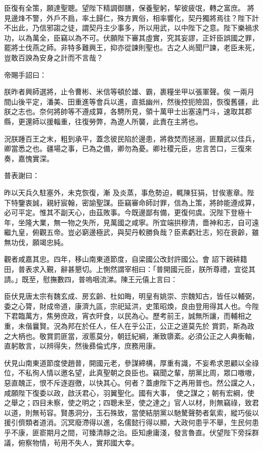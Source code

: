 \begin{pinyinscope}
 臣復有全策，願達聖聰。望陛下精調御膳，保養聖躬，挈彼疲氓，轉之富庶。
 將見邊烽不警，外戶不扃，率土歸仁，殊方異俗，相率響化，契丹獨將焉往？陛下計不出此，乃信邪謅之徒，謂契丹主少事多，所以用武，以中陛下之意。陛下樂禍求功，以為萬全，臣竊以為不可。伏願陛下審其虛實，究其妄謬，正奸臣誤國之罪，罷將士伐燕之師。非特多難興王，抑亦從諫則聖也。古之人尚聞尸諫，老臣未死，豈敢百諛為安身之計而不言哉？



 帝賜手詔曰：



 朕昨者興師選將，止令曹彬、米信等頓於雄、霸，裹糧坐甲以張軍聲。俟
 一兩月間山後平定，潘美、田重進等會兵以進，直抵幽州，然後控扼險固，恢復舊疆，此朕之志也。奈何將帥等不遵成算，各騁所見，領十萬甲士出塞遠門斗，速取其郡縣，更還師以援輜重，往復勞弊，為遼人所襲，此責在主將也。



 況朕踵百王之末，粗到承平，蓋念彼民陷於邊患，將救焚而拯溺，匪黷武以佳兵，卿當悉之也。疆場之事，已為之備，卿勿為憂。卿社稷元臣，忠言苦口，三復來奏，嘉愧實深。



 普表謝曰：



 昨以天兵久駐塞外，未克恢復，漸
 及炎蒸，事危勢迫，輒陳狂狷，甘俟憲章。陛下特鑒衷誠，親紆宸翰，密諭聖謀。臣竊審命師討罪，信為上策，將帥能遵成算，必可平定。惟其不副天心，由茲敗事。今既邊鄙有備，更復何虞。況陛下登極十年，坐隆大業，無一物之失所，見萬國之咸寧。所宜端拱穆清，嗇神和志，自可遠繼九皇，俯觀五帝。豈必窮邊極武，與契丹較勝負哉？臣素虧壯志，矧在衰齡，雖無功伐，願竭忠純。



 觀者咸嘉其忠。四年，移山南東道節度，自梁國公改封許國公。會
 詔下親耕籍田，普表求入覲，辭甚懇切。上惻然謂宰相曰：「普開國元臣，朕所尊禮，宜從其請。」既至，慰撫數四，普嗚咽流涕。陳王元僖上言曰：



 臣伏見唐太宗有魏玄成、房玄齡、杜如晦，明皇有姚崇、宗魏知古，皆任以輔弼，委之心膂，財成帝道，康濟九區，宗祀延洪，史策昭煥，良由登用得其人也。今陛下君臨萬方，焦勞庶政，宵衣旰食，以民為心。歷考前王，誠無所讓，而輔相之重，未偕曩賢。況為邦在於任人，任人在乎公正，公正之道莫先於
 賞罰，斯為政之大柄也。敬賞罰匪當，淑慝莫分，朝廷紀綱，漸致隳紊。必須公正之人典衡軸，直躬敢言，以辨得失，然後彞倫式序，庶務用康。



 伏見山南東道節度使趙普，開國元老，參謀締構，厚重有識，不妄希求恩顧以全祿位，不私徇人情以邀名望，此真聖朝之良臣也。竊聞之輩，朋黨比周，眾口嗷嗷，惡直醜正，恨不斥逐遐徼，以快其心。何者？蓋慮陛下之再用普也。然公讜之人，咸願陛下復委以政，啟沃君心，羽翼聖化。國有大事，
 使之謀之；朝有宏綱，使之舉之；四目未察，使之明之；四聰未至，使之達之」官人以材，則無竊祿，致君以道，則無茍容。賢愚洞分，玉石殊致，當使結朋黨以馳驁聲勢者氣索，縱巧佞以援引儕類者道消。沉冥廢滯得以進，名儒懿行得以顯，大政何患乎不舉，生民何患乎不康，匪窬期月之間，可臻清靜之治。臣知慮庸淺，發言魯直。伏望陛下旁採群議，俯察物情，茍用不失人，實邦國大幸。




\end{pinyinscope}
